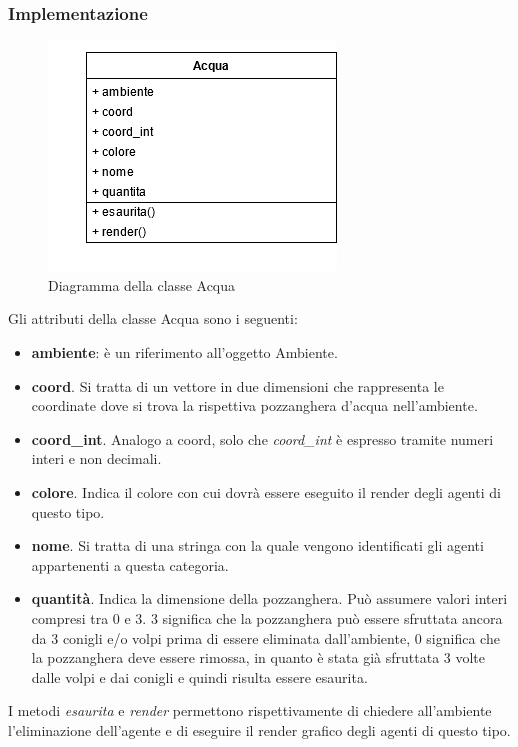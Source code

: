 \documentclass[11pt]{article}
\begin{document}
\subsubsection{Implementazione}
\begin{figure}[h!]
     \centering
     \includegraphics[scale = 0.7]{Acqua.png}
     \caption{Diagramma della classe Acqua}
     \label{fig:acquaUML}
\end{figure}

Gli attributi della classe Acqua sono i seguenti:
\begin{itemize}
    \item \textbf{ambiente}: è un riferimento all'oggetto Ambiente. 
    \item \textbf{coord}. Si tratta di un vettore in due dimensioni che rappresenta le coordinate dove si trova la rispettiva pozzanghera d'acqua nell'ambiente. 
    \item \textbf{coord\_int}. Analogo a coord, solo che \emph{coord\_int} è espresso tramite numeri interi e non decimali. 
    \item \textbf{colore}. Indica il colore con cui dovrà essere eseguito il render degli agenti di questo tipo.
    \item \textbf{nome}. Si tratta di una stringa con la quale vengono identificati gli agenti appartenenti a questa categoria. 
    \item \textbf{quantità}. Indica la dimensione della pozzanghera. Può assumere valori interi compresi tra 0 e 3. 3 significa che la pozzanghera può essere sfruttata ancora da 3 conigli e/o volpi prima di essere eliminata dall'ambiente, 0 significa che la pozzanghera deve essere rimossa, in quanto è stata già sfruttata 3 volte dalle volpi e dai conigli e quindi risulta essere esaurita. 
\end{itemize}

I metodi \emph{esaurita} e \emph{render} permettono rispettivamente di chiedere all'ambiente l'eliminazione dell'agente e di eseguire il render grafico degli agenti di questo tipo. 
\end{document}
